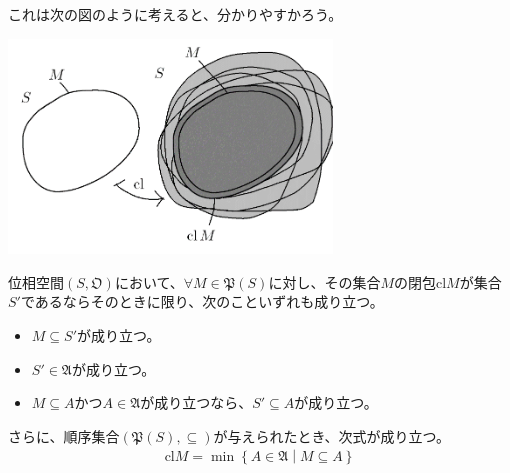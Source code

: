 \documentclass[dvipdfmx]{jsarticle}
\begin{document}
これは次の図のように考えると、分かりやすかろう。
\begin{center}
  \includegraphics[width=86mm]{8.1.1.b.png}
\end{center}
\begin{thm}\label{8.1.1.6}
位相空間$\left( S,\mathfrak{O} \right)$において、$\forall M \in \mathfrak{P}(S)$に対し、その集合$M$の閉包${\mathrm{cl}}M$が集合$S'$であるならそのときに限り、次のこといずれも成り立つ。
\begin{itemize}
\item
  $M \subseteq S'$が成り立つ。
\item
  $S'\in \mathfrak{A}$が成り立つ。
\item
  $M \subseteq A$かつ$A \in \mathfrak{A}$が成り立つなら、$S' \subseteq A$が成り立つ。
\end{itemize}
さらに、順序集合$\left( \mathfrak{P}(S), \subseteq \right)$が与えられたとき、次式が成り立つ。
\begin{align*}
{\mathrm{cl}}M = \min\left\{ A \in \mathfrak{A} \middle| M \subseteq A \right\}
\end{align*}
\end{thm}
\end{document}
